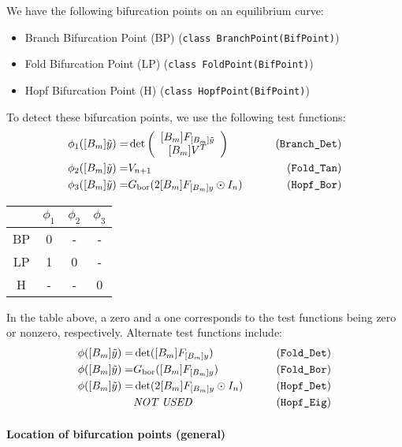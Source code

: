 \documentclass{article}[12pt]
\def\bF{\bm{F}}
\def\bV{\bm{V}}
\def\by{\bm{y}}
\def\bty{\bm{\tilde{y}}}
\begin{document}
We have the following bifurcation points on an equilibrium curve:
\begin{itemize}
\item Branch Bifurcation Point (BP) (\texttt{class BranchPoint(BifPoint)})
\item Fold Bifurcation Point (LP) (\texttt{class FoldPoint(BifPoint)})
\item Hopf Bifurcation Point (H) (\texttt{class HopfPoint(BifPoint)})
\end{itemize}
To detect these bifurcation points, we use the following test functions:
\begin{eqnarray}
\phi_{1}(\bty) = & \det\left(\begin{array}{c} \bF_{\bty} \\ \bV^{T} \end{array}\right) \qquad & \mbox{(\texttt{Branch\_Det})} \label{eq:BP-T1} \\
\phi_{2}(\bty) = & V_{n+1} \qquad & \mbox{(\texttt{Fold\_Tan})} \label{eq:LP-T1} \\
\phi_{3}(\bty) = & G_{\mathrm{bor}}(2\bF_{\by} \odot I_{n}) \qquad & \mbox{(\texttt{Hopf\_Bor})} \label{eq:H-T1}
\end{eqnarray}
\begin{center}
    \begin{tabular}{ | c | c | c | c |}
    \hline
     & $\phi_{1}$ & $\phi_{2}$ & $\phi_{3}$ \\ \hline
    BP & 0 & - & - \\ \hline
    LP & 1 & 0 & - \\ \hline
    H  & - & - & 0 \\ \hline
    \end{tabular}
\end{center}
In the table above, a zero and a one corresponds to the test functions being zero or nonzero, respectively.  Alternate test functions include:
\begin{eqnarray*}
\phi(\bty) = & \det(\bF_{\by}) \qquad & \mbox{(\texttt{Fold\_Det})} \label{eq:LP-T2} \\
\phi(\bty) = & G_{\mathrm{bor}}(\bF_{\by}) \qquad & \mbox{(\texttt{Fold\_Bor})} \label{eq:LP-T3} \\
\phi(\bty) = & \det(2\bF_{\by} \odot I_{n}) \qquad & \mbox{(\texttt{Hopf\_Det})} \label{eq:H-T2} \\
& \mbox{\textit{NOT USED}}  \qquad & \mbox{(\texttt{Hopf\_Eig})} \label{eq:H-T3}
\end{eqnarray*}

\paragraph{Location of bifurcation points (general)}
\end{document}

